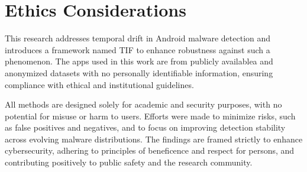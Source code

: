 \section{Ethics Considerations}

This research addresses temporal drift in Android malware detection and introduces a framework named TIF to enhance robustness against such a phenomenon. The apps used in this work are from publicly availablea and anonymized datasets with no personally identifiable information, ensuring compliance with ethical and institutional guidelines. 

All methods are designed solely for academic and security purposes, with no potential for misuse or harm to users. Efforts were made to minimize risks, such as false positives and negatives, and to focus on improving detection stability across evolving malware distributions. The findings are framed strictly to enhance cybersecurity, adhering to principles of beneficence and respect for persons, and contributing positively to public safety and the research community.